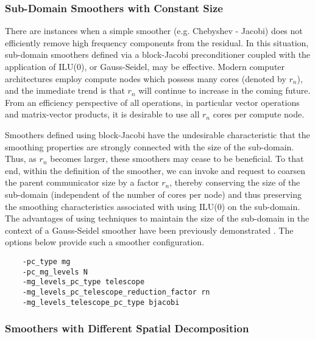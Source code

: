 \documentclass[]{siamart0216}
\begin{document}
\subsubsection{Sub-Domain Smoothers with Constant Size} \label{sec:sscontsize}
	There are instances when a simple smoother (e.g. Chebyshev - Jacobi) does not 
	efficiently remove high frequency components from the residual. 
In this situation, sub-domain smoothers defined via a block-Jacobi preconditioner 
	coupled with the application of ILU(0), or Gauss-Seidel, may be effective. 
Modern computer architectures employ compute nodes which possess many cores (denoted by $r_n$), and 
	the immediate trend is that $r_n$ will continue to increase in the coming future.
	From an efficiency perspective of all operations, in particular vector operations and matrix-vector products, 
	it is desirable to use all $r_n$ cores per compute node. 
	
	Smoothers defined using block-Jacobi have the undesirable characteristic that the smoothing 
	properties are strongly connected with the size of the sub-domain. Thus, as $r_n$ becomes larger,
	these smoothers may cease to be beneficial. To that end, within the definition of the smoother, 
	we can invoke  and request to coarsen the parent communicator size by a factor $r_n$, 
	thereby conserving the size of the sub-domain (independent of the number of cores per node) and 
	thus preserving the smoothing characteristics associated with using ILU(0) on the sub-domain. 
	The advantages of using techniques to maintain the size of the sub-domain in the 
	context of a Gauss-Seidel smoother have been previously demonstrated \cite{hoefler2013mpi}.
	The options below provide such a smoother configuration.
\begin{tcolorbox}[colframe=red,colback=cornsilk,boxrule=0.5pt,arc=4pt,
      left=-6pt,right=6pt,top=6pt,bottom=6pt,boxsep=0pt]
	\begin{verbatim}
    -pc_type mg
    -pc_mg_levels N
    -mg_levels_pc_type telescope
    -mg_levels_pc_telescope_reduction_factor rn
    -mg_levels_telescope_pc_type bjacobi
	\end{verbatim}
\end{tcolorbox}
\subsubsection{Smoothers with Different Spatial Decomposition}  \label{sec:ssdiffsd}
\end{document}
